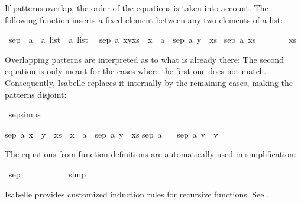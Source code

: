 \begin{isabellebody}
\begin{isamarkuptext}
  If patterns overlap, the order of the equations is taken into
  account. The following function inserts a fixed element between any
  two elements of a list:%
\end{isamarkuptext}%
\isamarkuptrue%
\isamarkupfalse%
\ sep\ {\isacharcolon}{\isacharcolon}\ {\isachardoublequoteopen}{\isacharprime}a\ {\isasymRightarrow}\ {\isacharprime}a\ list\ {\isasymRightarrow}\ {\isacharprime}a\ list{\isachardoublequoteclose}\isanewline
{}\isanewline
\ \ {\isachardoublequoteopen}sep\ a\ {\isacharparenleft}x{\isacharhash}y{\isacharhash}xs{\isacharparenright}\ {\isacharequal}\ x\ {\isacharhash}\ a\ {\isacharhash}\ sep\ a\ {\isacharparenleft}y\ {\isacharhash}\ xs{\isacharparenright}{\isachardoublequoteclose}\isanewline
{\isacharbar}\ {\isachardoublequoteopen}sep\ a\ xs\ \ \ \ \ \ \ {\isacharequal}\ xs{\isachardoublequoteclose}%
\begin{isamarkuptext}%
Overlapping patterns are interpreted as  to what is
  already there: The second equation is only meant for the cases where
  the first one does not match. Consequently, Isabelle replaces it
  internally by the remaining cases, making the patterns disjoint:%
\end{isamarkuptext}%
\isamarkuptrue%
\isamarkupfalse%
\ sep{\isachardot}simps%
\begin{isamarkuptext}%
\begin{isabelle}%
sep\ a\ {\isacharparenleft}x\ {\isacharhash}\ y\ {\isacharhash}\ xs{\isacharparenright}\ {\isacharequal}\ x\ {\isacharhash}\ a\ {\isacharhash}\ sep\ a\ {\isacharparenleft}y\ {\isacharhash}\ xs{\isacharparenright}\isasep\isanewline%
sep\ a\ {\isacharbrackleft}{\isacharbrackright}\ {\isacharequal}\ {\isacharbrackleft}{\isacharbrackright}\isasep\isanewline%
sep\ a\ {\isacharbrackleft}v{\isacharbrackright}\ {\isacharequal}\ {\isacharbrackleft}v{\isacharbrackright}%
\end{isabelle}%
\end{isamarkuptext}%
\isamarkuptrue%
%
\begin{isamarkuptext}%
The equations from function definitions are automatically used in
  simplification:%
\end{isamarkuptext}%
\isamarkuptrue%
\isamarkupfalse%
\ {\isachardoublequoteopen}sep\ {}\ {\isacharbrackleft}{}{\isacharcomma}\ {}{\isacharcomma}\ {}{\isacharbrackright}\ {\isacharequal}\ {\isacharbrackleft}{}{\isacharcomma}\ {}{\isacharcomma}\ {}{\isacharcomma}\ {}{\isacharcomma}\ {}{\isacharbrackright}{\isachardoublequoteclose}\isanewline
%
\isadelimproof
%
\endisadelimproof
%
\isatagproof
{}\isamarkupfalse%
\ simp%
\endisatagproof
{\isafoldproof}%
%
\isadelimproof
%
\endisadelimproof
%
\isamarkuptrue%
%
\begin{isamarkuptext}%
Isabelle provides customized induction rules for recursive functions.  
  See \cite[\S3.5.4]{isa-tutorial}. 



\end{isamarkuptext}
\end{isabellebody}
